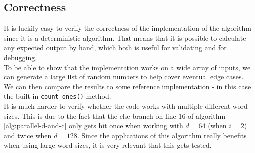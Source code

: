 \subsection{Correctness}
It is luckily easy to verify the correctness of the implementation of the algorithm since it is a deterministic algorithm. That means that it is possible to calculate any expected output by hand, which both is useful for validating and for debugging.\\
To be able to show that the implementation works on a wide array of inputs, we can generate a large list of random numbers to help cover eventual edge cases. We can then compare the results to some reference implementation - in this case the built-in \texttt{count\_ones()} method.\\
It is much harder to verify whether the code works with multiple different word-sizes. This is due to the fact that the else branch on line 16 of algorithm \ref{alg:parallel-d-and-c} only gets hit once when working with $d=64$ (when $i=2$) and twice when $d=128$. Since the applications of this algorithm really benefits when using large word sizes, it is very relevant that this gets tested.

